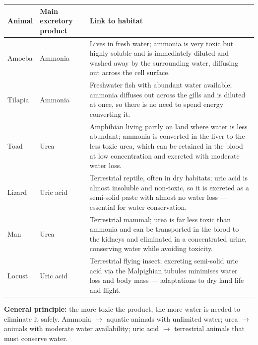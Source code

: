 \documentclass[11pt]{article}
\begin{document}
\begin{corrige}
\begin{center}
\begin{tabularx}{\linewidth}{|l|X|X|}
\hline
\rowcolor{popblueL} \textbf{Animal} & \textbf{Main excretory product} & \textbf{Link to habitat} \\
\hline
Amoeba & Ammonia & Lives in fresh water; ammonia is very toxic but highly soluble and is immediately diluted and washed away by the surrounding water, diffusing out across the cell surface. \\
\hline
Tilapia & Ammonia & Freshwater fish with abundant water available; ammonia diffuses out across the gills and is diluted at once, so there is no need to spend energy converting it. \\
\hline
Toad & Urea & Amphibian living partly on land where water is less abundant; ammonia is converted in the liver to the less toxic urea, which can be retained in the blood at low concentration and excreted with moderate water loss. \\
\hline
Lizard & Uric acid & Terrestrial reptile, often in dry habitats; uric acid is almost insoluble and non-toxic, so it is excreted as a semi-solid paste with almost no water loss — essential for water conservation. \\
\hline
Man & Urea & Terrestrial mammal; urea is far less toxic than ammonia and can be transported in the blood to the kidneys and eliminated in a concentrated urine, conserving water while avoiding toxicity. \\
\hline
Locust & Uric acid & Terrestrial flying insect; excreting semi-solid uric acid via the Malpighian tubules minimises water loss and body mass — adaptations to dry land life and flight. \\
\hline
\end{tabularx}
\end{center}
\textbf{General principle:} the more toxic the product, the more water is needed to eliminate it safely. Ammonia $\rightarrow$ aquatic animals with unlimited water; urea $\rightarrow$ animals with moderate water availability; uric acid $\rightarrow$ terrestrial animals that must conserve water.
\end{corrige}
\end{document}
